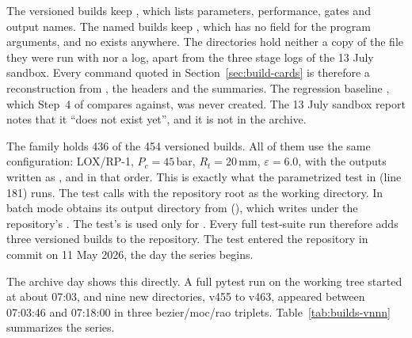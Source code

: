 The versioned builds keep , which lists parameters, performance, gates and output names. The named builds keep , which has no field for the program arguments, and no  exists anywhere. The  directories hold neither a copy of the  file they were run with nor a log, apart from the three stage logs of the 13 July sandbox. Every command quoted in Section~\ref{sec:build-cards} is therefore a reconstruction from , the  headers and the summaries. The regression baseline , which Step~4 of  compares against, was never created. The 13 July sandbox report notes that it ``does not exist yet'', and it is not in the archive.

The  family holds 436 of the 454 versioned builds. All of them use the same configuration: LOX/RP-1, $P_c = 45$\,bar, $R_t = 20$\,mm, $\varepsilon = 6.0$, with the outputs written as ,  and  in that order. This is exactly what the parametrized test  in  (line 181) runs. The test calls               with the repository root as the working directory. In batch mode  obtains its output directory from  (), which writes under the repository's . The test's  is used only for . Every full test-suite run therefore adds three versioned builds to the repository. The test entered the repository in commit  on 11 May 2026, the day the series begins.

The archive day shows this directly. A full pytest run on the working tree started at about 07:03, and nine new directories, v455 to v463, appeared between 07:03:46 and 07:18:00 in three bezier/moc/rao triplets. Table~\ref{tab:builds-vnnn} summarizes the series.

